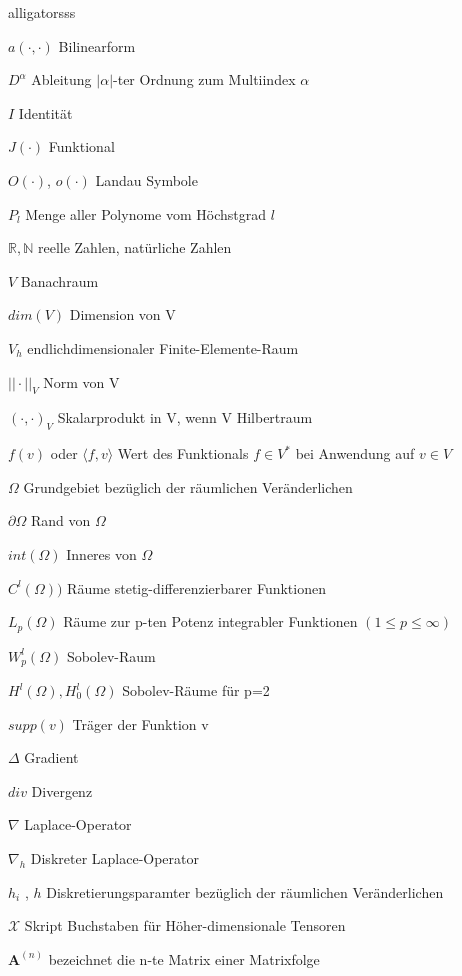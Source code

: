 \documentclass[12pt,a4paper]{scrartcl}
\numberwithin{equation}{section}
\begin{document}
\begin{labeling}{alligatorsss \quad \quad }
\item [$a(\cdot,\cdot)$] Bilinearform
\item [$D^{\alpha}$] Ableitung $|\alpha|$-ter Ordnung zum Multiindex $\alpha$
\item [$I$] Identität
\item [$J(\cdot)$] Funktional
\item [$O(\cdot)$, $o(\cdot)$] Landau Symbole
\item [$P_l$] Menge aller Polynome vom Höchstgrad $l$
\item [$\mathbb{R},\mathbb{N}$] reelle Zahlen, natürliche Zahlen
\item [$V$] Banachraum
\item [$dim(V)$] Dimension von V
\item [$V_h$] endlichdimensionaler Finite-Elemente-Raum
\item [$||\cdot||_V$] Norm von V
\item [$(\cdot,\cdot)_V$] Skalarprodukt in V, wenn V Hilbertraum
\item [$f(v)$ oder $\langle f , v \rangle$] Wert des Funktionals $f \in V^{*}$ bei Anwendung auf $v \in V$
\item [$\Omega$] Grundgebiet bezüglich der räumlichen Veränderlichen
\item [$\partial \Omega$] Rand von $\Omega$
\item [$int( \Omega)$] Inneres von $\Omega$
\item [$C^{l}(\Omega))$] Räume stetig-differenzierbarer Funktionen
\item [$L_p(\Omega)$] Räume zur p-ten Potenz integrabler Funktionen $(1 \leq p \leq \infty)$
\item [$W_p^l(\Omega)$] Sobolev-Raum
\item [$H^l(\Omega),H_0^l(\Omega)$] Sobolev-Räume für p=2
\item [$supp(v)$] Träger der Funktion v
\item [$\Delta$] Gradient
\item [$div$] Divergenz
\item [$\nabla$] Laplace-Operator
\item [$\nabla_h$] Diskreter Laplace-Operator
\item [$h_i$ , $h$] Diskretierungsparamter bezüglich der räumlichen Veränderlichen
\item [$\pmb{\mathscr{X}}$] Skript Buchstaben für Höher-dimensionale Tensoren
\item [$\textbf{A}^{(n)}$] bezeichnet die n-te Matrix einer Matrixfolge

\end{labeling}
\end{document}
